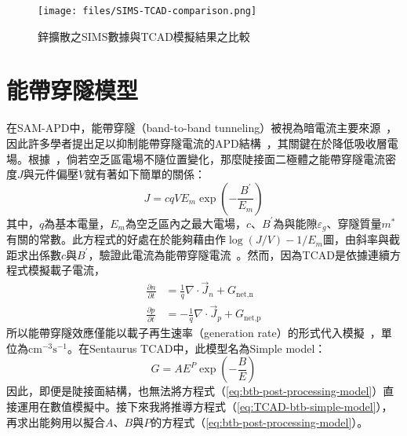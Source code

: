 \begin{figure}[h]
\centering
\texttt{[image: files/SIMS-TCAD-comparison.png]}
\caption{鋅擴散之SIMS數據與TCAD模擬結果之比較}
\label{fig:SIMS-TCAD-comparison}
\end{figure}
\clearpage
\section{能帶穿隧模型}\label{cs:btb-tunneling}
在SAM-APD中，能帶穿隧（band-to-band tunneling）被視為暗電流主要來源~\cite{forrest1980evidence}\cite{Forrest:1980cna}，因此許多學者提出足以抑制能帶穿隧電流的APD結構~\cite{Ando:1980fn}\cite{Acerbi:2013bz}\cite{Takanashi:1980vg}\cite{Donnelly:2006en}\cite{Verghese:2007bf}，其關鍵在於降低吸收層電場。根據~\cite{Liou:1990uf}，倘若空乏區電場不隨位置變化，那麼陡接面二極體之能帶穿隧電流密度$J$與元件偏壓$V$就有著如下簡單的關係：
\begin{equation}
J=cqVE_m\exp\left(-\frac{B^\prime}{E_m}\right)\label{eq:btb-post-processing-model}
\end{equation}
其中，$q$為基本電量，$E_m$為空乏區內之最大電場，$c$、$B^\prime$為與能隙$\varepsilon_g$、穿隧質量$m^*$有關的常數。此方程式的好處在於能夠藉由作$\log(J/V)-1/E_m$圖，由斜率與截距求出係數$c$與$B^\prime$，驗證此電流為能帶穿隧電流~\cite{Hurkx:1998wn}。然而，因為TCAD是依據連續方程式模擬載子電流，
\begin{equation}\label{eq:continuity-equation}
\begin{aligned}
\frac{\partial n}{\partial t}&=\frac{1}{q}\nabla\cdot\vec{J}_n+G_\text{net,n}\\[5pt]
\frac{\partial p}{\partial t}&=-\frac{1}{q}\nabla\cdot\vec{J}_p+G_\text{net,p}
\end{aligned}
\end{equation}
所以能帶穿隧效應僅能以載子再生速率（generation rate）的形式代入模擬~\cite{sentaurus2016sdevice}，單位為$\mathrm{cm}^{-3}\mathrm{s}^{-1}$。在Sentaurus TCAD中，此模型名為Simple model：
\begin{equation}
G=AE^P\exp\left(-\frac{B}{E}\right)\label{eq:TCAD-btb-simple-model}
\end{equation}
因此，即便是陡接面結構，也無法將方程式（\ref{eq:btb-post-processing-model}）直接運用在數值模擬中。接下來我將推導方程式（\ref{eq:TCAD-btb-simple-model}），再求出能夠用以擬合$A$、$B$與$P$的方程式（\ref{eq:btb-post-processing-model}）。
